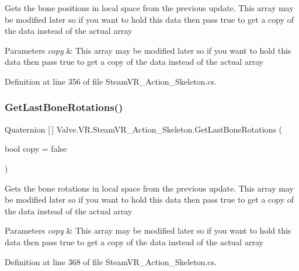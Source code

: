 Gets the bone positions in local space from the previous update. This array may be modified later so if you want to hold this data then pass true to get a copy of the data instead of the actual array 


\begin{DoxyParams}{Parameters}
{\em copy} & This array may be modified later so if you want to hold this data then pass true to get a copy of the data instead of the actual array\\
\hline
\end{DoxyParams}


Definition at line 356 of file Steam\+V\+R\+\_\+\+Action\+\_\+\+Skeleton.\+cs.

\mbox{\label{class_valve_1_1_v_r_1_1_steam_v_r___action___skeleton_a35816d947506cb60a58cd58cf5b49025}} 
\subsubsection{\texorpdfstring{GetLastBoneRotations()}{GetLastBoneRotations()}}
{\footnotesize\ttfamily Quaternion \mbox{[}$\,$\mbox{]} Valve.\+V\+R.\+Steam\+V\+R\+\_\+\+Action\+\_\+\+Skeleton.\+Get\+Last\+Bone\+Rotations (\begin{DoxyParamCaption}\item[{bool}]{copy = {\ttfamily false} }\end{DoxyParamCaption})}



Gets the bone rotations in local space from the previous update. This array may be modified later so if you want to hold this data then pass true to get a copy of the data instead of the actual array 


\begin{DoxyParams}{Parameters}
{\em copy} & This array may be modified later so if you want to hold this data then pass true to get a copy of the data instead of the actual array\\
\hline
\end{DoxyParams}


Definition at line 368 of file Steam\+V\+R\+\_\+\+Action\+\_\+\+Skeleton.\+cs.

\mbox{\label{class_valve_1_1_v_r_1_1_steam_v_r___action___skeleton_af2dfd31fde98f66696406d9f78c82e34}} 
